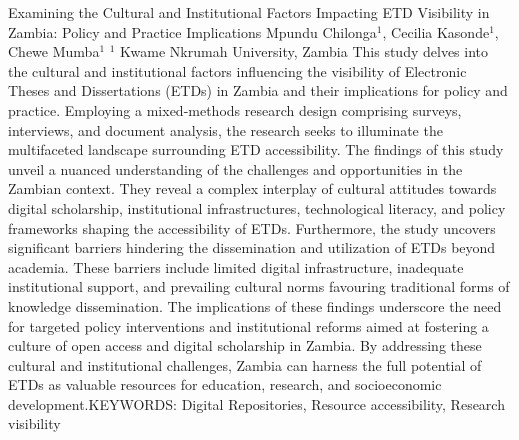 
    \begin{abstract_online}{Examining the Cultural and Institutional Factors Impacting ETD Visibility in Zambia: Policy and Practice Implications}{%
        Mpundu Chilonga$^{1}$, Cecilia Kasonde$^{1}$, Chewe Mumba$^{1}$}{%
        }{%
        $^1$ Kwame Nkrumah University, Zambia}{%
        }
        This study delves into the cultural and institutional factors influencing the visibility of Electronic Theses and Dissertations (ETDs) in Zambia and their implications for policy and practice. Employing a mixed-methods research design comprising surveys, interviews, and document analysis, the research seeks to illuminate the multifaceted landscape surrounding ETD accessibility. The findings of this study unveil a nuanced understanding of the challenges and opportunities in the Zambian context. They reveal a complex interplay of cultural attitudes towards digital scholarship, institutional infrastructures, technological literacy, and policy frameworks shaping the accessibility of ETDs. Furthermore, the study uncovers significant barriers hindering the dissemination and utilization of ETDs beyond academia. These barriers include limited digital infrastructure, inadequate institutional support, and prevailing cultural norms favouring traditional forms of knowledge dissemination. The implications of these findings underscore the need for targeted policy interventions and institutional reforms aimed at fostering a culture of open access and digital scholarship in Zambia. By addressing these cultural and institutional challenges, Zambia can harness the full potential of ETDs as valuable resources for education, research, and socioeconomic development.KEYWORDS: Digital Repositories, Resource accessibility, Research visibility

    \end{abstract_online}
    
